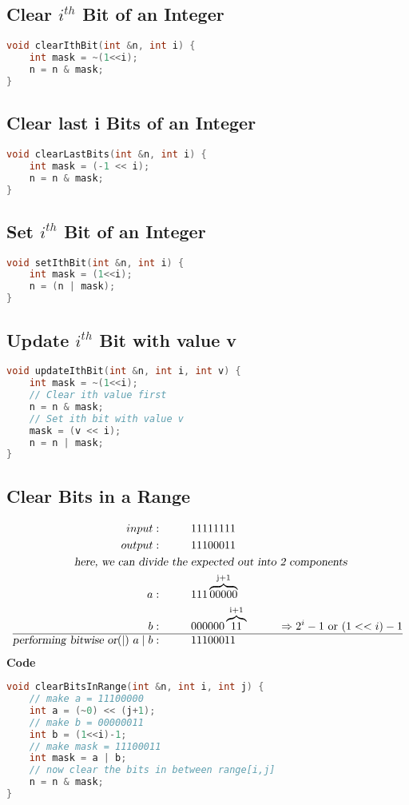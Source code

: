 \subsection{Clear $i^{th}$ Bit of an Integer}
\begin{lstlisting}[language=c++]
void clearIthBit(int &n, int i) {
    int mask = ~(1<<i);
    n = n & mask;
}
\end{lstlisting}

\subsection{Clear last i Bits of an Integer}
\begin{lstlisting}[language=c++]
void clearLastBits(int &n, int i) {
    int mask = (-1 << i);
    n = n & mask;
}
\end{lstlisting}

\subsection{Set $i^{th}$ Bit of an Integer}
\begin{lstlisting}[language=c++]
void setIthBit(int &n, int i) {
    int mask = (1<<i);
    n = (n | mask);
}
\end{lstlisting}

\subsection{Update $i^{th}$ Bit with value v}
\begin{lstlisting}[language=c++]
void updateIthBit(int &n, int i, int v) {
    int mask = ~(1<<i);
    // Clear ith value first
    n = n & mask;
    // Set ith bit with value v
    mask = (v << i);
    n = n | mask;
}
\end{lstlisting}

\subsection{Clear Bits in a Range}
\begin{align*}
	input:\hspace*{1cm} & 11111111\\
	output:\hspace*{1cm} & 11100011\\
	\textsl{here, we can divide the } & \textsl{expected out into 2 components}\\
	a:\hspace*{1cm} & 111\overbrace{00000}^\text{j+1}\\
	b:\hspace*{1cm} & 000000\overbrace{11}^\text{i+1}\hspace*{1cm}\Rightarrow\text{$2^i-1$ or $(1<<i)-1$} \\
	\hline
	\textsl{performing bitwise or$(\mid)$ } a\mid b:\hspace*{1cm} & 11100011\\
\end{align*}
\textbf{Code}
\begin{lstlisting}[language=c++]
void clearBitsInRange(int &n, int i, int j) {
    // make a = 11100000
    int a = (~0) << (j+1);
    // make b = 00000011
    int b = (1<<i)-1;
    // make mask = 11100011
    int mask = a | b;
    // now clear the bits in between range[i,j]
    n = n & mask;
}

\end{lstlisting}

